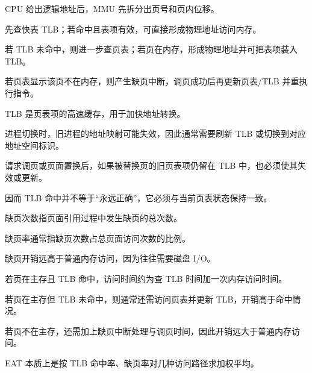 \begin{points}
  \item CPU 给出逻辑地址后，MMU 先拆分出页号和页内位移。
  \item 先查快表 TLB；若命中且表项有效，可直接形成物理地址访问内存。
  \item 若 TLB 未命中，则进一步查页表；若页在内存，形成物理地址并可把表项装入 TLB。
  \item 若页表显示该页不在内存，则产生缺页中断，调页成功后再更新页表/TLB 并重执行指令。
\end{points}


\begin{points}
  \item TLB 是页表项的高速缓存，用于加快地址转换。
  \item 进程切换时，旧进程的地址映射可能失效，因此通常需要刷新 TLB 或切换到对应地址空间标识。
  \item 请求调页或页面置换后，如果被替换页的旧页表项仍留在 TLB 中，也必须使其失效或更新。
  \item 因而 TLB 命中并不等于“永远正确”，它必须与当前页表状态保持一致。
\end{points}


\begin{points}
  \item 缺页次数指页面引用过程中发生缺页的总次数。
  \item 缺页率通常指缺页次数占总页面访问次数的比例。
  \item 缺页开销远高于普通内存访问，因为往往需要磁盘 I/O。
\end{points}


\begin{points}
  \item 若页在主存且 TLB 命中，访问时间约为查 TLB 时间加一次内存访问时间。
  \item 若页在主存但 TLB 未命中，则通常还需访问页表并更新 TLB，开销高于命中情况。
  \item 若页不在主存，还需加上缺页中断处理与调页时间，因此开销远大于普通内存访问。
  \item EAT 本质上是按 TLB 命中率、缺页率对几种访问路径求加权平均。
\end{points}


